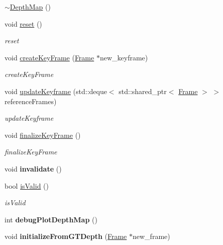 \begin{DoxyCompactItemize}
\item 
\hyperlink{classlsd__slam_1_1_depth_map_a82037faec3cabf13bf96976c8076735e}{$\sim$\-Depth\-Map} ()
\item 
void \hyperlink{classlsd__slam_1_1_depth_map_ab8fc38eab2fd508e7fca49b58787b687}{reset} ()
\begin{DoxyCompactList}\small\item\em reset \end{DoxyCompactList}\item 
void \hyperlink{classlsd__slam_1_1_depth_map_add52a76d9e4ebdb9f14408bf3e996d8c}{create\-Key\-Frame} (\hyperlink{classlsd__slam_1_1_frame}{Frame} $\ast$new\-\_\-keyframe)
\begin{DoxyCompactList}\small\item\em create\-Key\-Frame \end{DoxyCompactList}\item 
void \hyperlink{classlsd__slam_1_1_depth_map_a80d89c896825d97dd61021ea8dc904eb}{update\-Keyframe} (std\-::deque$<$ std\-::shared\-\_\-ptr$<$ \hyperlink{classlsd__slam_1_1_frame}{Frame} $>$ $>$ reference\-Frames)
\begin{DoxyCompactList}\small\item\em update\-Keyframe \end{DoxyCompactList}\item 
void \hyperlink{classlsd__slam_1_1_depth_map_a30d6435ab093553615696f68e3a157d8}{finalize\-Key\-Frame} ()
\begin{DoxyCompactList}\small\item\em finalize\-Key\-Frame \end{DoxyCompactList}\item 
\hypertarget{classlsd__slam_1_1_depth_map_ac4fa06d232e9964882dd19cc44a31c3e}{void {\bfseries invalidate} ()}\label{classlsd__slam_1_1_depth_map_ac4fa06d232e9964882dd19cc44a31c3e}

\item 
bool \hyperlink{classlsd__slam_1_1_depth_map_a77ffa8175ac0ff7e3d9a6bbe72d7fe93}{is\-Valid} ()
\begin{DoxyCompactList}\small\item\em is\-Valid \end{DoxyCompactList}\item 
\hypertarget{classlsd__slam_1_1_depth_map_a30565f7b2f6fddff49694a05ddac983d}{int {\bfseries debug\-Plot\-Depth\-Map} ()}\label{classlsd__slam_1_1_depth_map_a30565f7b2f6fddff49694a05ddac983d}

\item 
\hypertarget{classlsd__slam_1_1_depth_map_aef0161396bb13077d05198f0f5514e4c}{void {\bfseries initialize\-From\-G\-T\-Depth} (\hyperlink{classlsd__slam_1_1_frame}{Frame} $\ast$new\-\_\-frame)}\label{classlsd__slam_1_1_depth_map_aef0161396bb13077d05198f0f5514e4c}


\end{DoxyCompactItemize}

